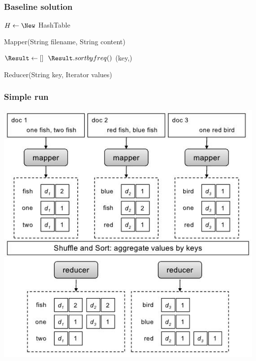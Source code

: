 \begin{frame}
\frametitle{Baseline solution}


\begin{algorithm}[H]
$H \leftarrow \New$ HashTable\;
\caption{Mapper(String filename, String content)}
\end{algorithm}

\vspace{-1em}
\begin{algorithm}[H]
$\Result \leftarrow []$\;
$\Result.sortbyfreq()$\;
\Emit(key,\Result)\;
\caption{Reducer(String key, Iterator values)}
\end{algorithm}
\end{frame}

\begin{frame}
\frametitle{Simple run}
\begin{center}
\includegraphics[scale=0.5,keepaspectratio=true]{figs/12/invindexing.jpeg}
\end{center}
\end{frame}

